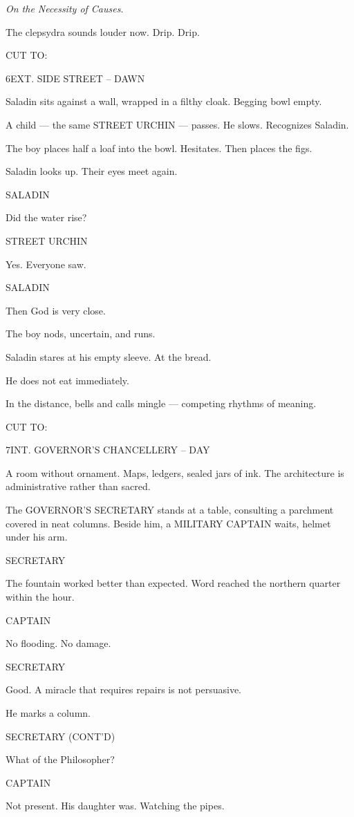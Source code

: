 \documentclass[12pt]{article}
\newlength{\charindent}
\newlength{\dialogueindent}
\newlength{\dialoguewidth}
\newlength{\transitionindent}
\newcommand{\slug}[1]{%
  \needspace{4\baselineskip}%
  \vspace{1.5em}%
  \noindent\MakeUppercase{#1}%
  \nopagebreak[4]%
  \par\vspace{0.75em}%
}
\newcommand{\action}[1]{%
  \noindent#1\par\vspace{0.75em}%
}
\newcommand{\character}[1]{%
  \needspace{3\baselineskip}%
  \par\vspace{0.5em}%
  \noindent\hspace*{\charindent}\MakeUppercase{#1}\nopagebreak[4]%
}
\newcommand{\dialogue}[1]{%
  \par\nobreak\nopagebreak[4]%
  \noindent\hspace*{\dialogueindent}%
  \begin{minipage}[t]{\dialoguewidth}
  #1
  \end{minipage}%
  \par\vspace{0.5em}%
}
\newcommand{\transition}[1]{%
  \needspace{2\baselineskip}%
  \par\vspace{1em}%
  \noindent\hspace*{\transitionindent}\MakeUppercase{#1}%
  \par%
}
\newcommand{\contd}{\textsc{(cont'd)}}
\begin{document}
\action{\textit{On the Necessity of Causes}.}

\action{The clepsydra sounds louder now. Drip. Drip.}

\transition{CUT TO:}

\slug{6\quad EXT. SIDE STREET -- DAWN}

\action{Saladin sits against a wall, wrapped in a filthy cloak. Begging bowl empty.}

\action{A child — the same STREET URCHIN — passes. He slows. Recognizes Saladin.}

\action{The boy places half a loaf into the bowl. Hesitates. Then places the figs.}

\action{Saladin looks up. Their eyes meet again.}

\character{SALADIN}
\dialogue{Did the water rise?}

\character{STREET URCHIN}
\dialogue{Yes. Everyone saw.}

\character{SALADIN}
\dialogue{Then God is very close.}

\action{The boy nods, uncertain, and runs.}

\action{Saladin stares at his empty sleeve. At the bread.}

\action{He does not eat immediately.}

\action{In the distance, bells and calls mingle — competing rhythms of meaning.}

\transition{CUT TO:}
\slug{7\quad INT. GOVERNOR'S CHANCELLERY -- DAY}

\action{A room without ornament. Maps, ledgers, sealed jars of ink. The architecture is administrative rather than sacred.}

\action{The GOVERNOR’S SECRETARY stands at a table, consulting a parchment covered in neat columns. Beside him, a MILITARY CAPTAIN waits, helmet under his arm.}

\character{SECRETARY}
\dialogue{The fountain worked better than expected. Word reached the northern quarter within the hour.}

\character{CAPTAIN}
\dialogue{No flooding. No damage.}

\character{SECRETARY}
\dialogue{Good. A miracle that requires repairs is not persuasive.}

\action{He marks a column.}

\character{SECRETARY \contd}
\dialogue{What of the Philosopher?}

\character{CAPTAIN}
\dialogue{Not present. His daughter was. Watching the pipes.}
\end{document}
